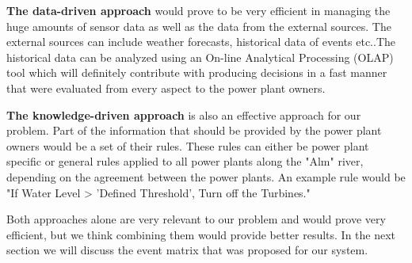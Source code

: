 \textbf{The data-driven approach} would prove to be very efficient in managing the huge amounts of sensor data as well as the data from the external sources. The external sources can include weather forecasts, historical data of events etc..The historical data can be analyzed using an On-line Analytical Processing (OLAP) tool which will definitely contribute with producing decisions in a fast manner that were evaluated from every aspect to the power plant owners.

\textbf{The knowledge-driven approach} is also an effective approach for our problem. Part of the information that should be provided by the power plant owners would be a set of their rules. These rules can either be power plant specific or general rules applied to all power plants along the "Alm" river, depending on the agreement between the power plants. An example rule would be "If Water Level > 'Defined Threshold', Turn off the Turbines."

Both approaches alone are very relevant to our problem and would prove very efficient, but we think combining them would provide better results. In the next section we will discuss the event matrix that was proposed for our system.

